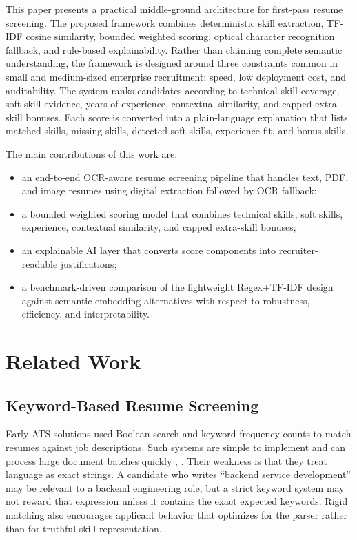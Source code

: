 \documentclass[conference]{IEEEtran}
\begin{document}
This paper presents a practical middle-ground architecture for first-pass resume screening. The proposed framework combines deterministic skill extraction, TF-IDF cosine similarity, bounded weighted scoring, optical character recognition fallback, and rule-based explainability. Rather than claiming complete semantic understanding, the framework is designed around three constraints common in small and medium-sized enterprise recruitment: speed, low deployment cost, and auditability. The system ranks candidates according to technical skill coverage, soft skill evidence, years of experience, contextual similarity, and capped extra-skill bonuses. Each score is converted into a plain-language explanation that lists matched skills, missing skills, detected soft skills, experience fit, and bonus skills.

The main contributions of this work are:
\begin{itemize}
    \item an end-to-end OCR-aware resume screening pipeline that handles text, PDF, and image resumes using digital extraction followed by OCR fallback;
    \item a bounded weighted scoring model that combines technical skills, soft skills, experience, contextual similarity, and capped extra-skill bonuses;
    \item an explainable AI layer that converts score components into recruiter-readable justifications;
    \item a benchmark-driven comparison of the lightweight Regex+TF-IDF design against semantic embedding alternatives with respect to robustness, efficiency, and interpretability.
\end{itemize}

\section{Related Work}
\subsection{Keyword-Based Resume Screening}
Early ATS solutions used Boolean search and keyword frequency counts to match resumes against job descriptions. Such systems are simple to implement and can process large document batches quickly \cite{b1}, \cite{b3}. Their weakness is that they treat language as exact strings. A candidate who writes ``backend service development'' may be relevant to a backend engineering role, but a strict keyword system may not reward that expression unless it contains the exact expected keywords. Rigid matching also encourages applicant behavior that optimizes for the parser rather than for truthful skill representation.
\end{document}
